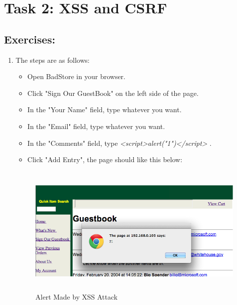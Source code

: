 \section*{Task 2: XSS and CSRF}
\subsection*{Exercises:}
\begin{enumerate}
\item The steps are as follows: 
  \begin{itemize}
  \item Open BadStore in your browser.
  \item Click "Sign Our GuestBook" on the left side of the page.
  \item In the "Your Name" field, type whatever you want.
  \item In the "Email" field, type whatever you want.
  \item In the "Comments" field, type \textit{<script>alert("1")</script>} .
  \item Click "Add Entry", the page should like this below:
  \end{itemize}
  \begin{figure}[h!]
    \caption{Alert Made by XSS Attack}
    \begin{center}\includegraphics[height=2.5in]{xss}
    \end{center}
  \end{figure}


\end{enumerate}
